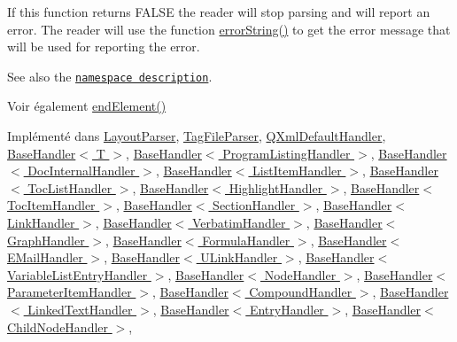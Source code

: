 If this function returns F\+A\+L\+S\+E the reader will stop parsing and will report an error. The reader will use the function \hyperlink{class_q_xml_content_handler_adba96547bad1cf1b009dbfb7b7c571be}{error\+String()} to get the error message that will be used for reporting the error.

See also the \href{xml-sax.html#namespaces}{\tt namespace description}.

\begin{DoxySeeAlso}{Voir également}
\hyperlink{class_q_xml_content_handler_af0abc06326798a6e522f91e6174b7b9e}{end\+Element()} 
\end{DoxySeeAlso}


Implémenté dans \hyperlink{class_layout_parser_aa870786ef488ce9d300214dab2c497ae}{Layout\+Parser}, \hyperlink{class_tag_file_parser_ad9f6b4e83d37df58b95a2018d4e2e606}{Tag\+File\+Parser}, \hyperlink{class_q_xml_default_handler_a0381a337b32a16d2ef2a8df9a29cb215}{Q\+Xml\+Default\+Handler}, \hyperlink{class_base_handler_a15c20baf7065b3eb92ae7a336ccdf20b}{Base\+Handler$<$ T $>$}, \hyperlink{class_base_handler_a15c20baf7065b3eb92ae7a336ccdf20b}{Base\+Handler$<$ Program\+Listing\+Handler $>$}, \hyperlink{class_base_handler_a15c20baf7065b3eb92ae7a336ccdf20b}{Base\+Handler$<$ Doc\+Internal\+Handler $>$}, \hyperlink{class_base_handler_a15c20baf7065b3eb92ae7a336ccdf20b}{Base\+Handler$<$ List\+Item\+Handler $>$}, \hyperlink{class_base_handler_a15c20baf7065b3eb92ae7a336ccdf20b}{Base\+Handler$<$ Toc\+List\+Handler $>$}, \hyperlink{class_base_handler_a15c20baf7065b3eb92ae7a336ccdf20b}{Base\+Handler$<$ Highlight\+Handler $>$}, \hyperlink{class_base_handler_a15c20baf7065b3eb92ae7a336ccdf20b}{Base\+Handler$<$ Toc\+Item\+Handler $>$}, \hyperlink{class_base_handler_a15c20baf7065b3eb92ae7a336ccdf20b}{Base\+Handler$<$ Section\+Handler $>$}, \hyperlink{class_base_handler_a15c20baf7065b3eb92ae7a336ccdf20b}{Base\+Handler$<$ Link\+Handler $>$}, \hyperlink{class_base_handler_a15c20baf7065b3eb92ae7a336ccdf20b}{Base\+Handler$<$ Verbatim\+Handler $>$}, \hyperlink{class_base_handler_a15c20baf7065b3eb92ae7a336ccdf20b}{Base\+Handler$<$ Graph\+Handler $>$}, \hyperlink{class_base_handler_a15c20baf7065b3eb92ae7a336ccdf20b}{Base\+Handler$<$ Formula\+Handler $>$}, \hyperlink{class_base_handler_a15c20baf7065b3eb92ae7a336ccdf20b}{Base\+Handler$<$ E\+Mail\+Handler $>$}, \hyperlink{class_base_handler_a15c20baf7065b3eb92ae7a336ccdf20b}{Base\+Handler$<$ U\+Link\+Handler $>$}, \hyperlink{class_base_handler_a15c20baf7065b3eb92ae7a336ccdf20b}{Base\+Handler$<$ Variable\+List\+Entry\+Handler $>$}, \hyperlink{class_base_handler_a15c20baf7065b3eb92ae7a336ccdf20b}{Base\+Handler$<$ Node\+Handler $>$}, \hyperlink{class_base_handler_a15c20baf7065b3eb92ae7a336ccdf20b}{Base\+Handler$<$ Parameter\+Item\+Handler $>$}, \hyperlink{class_base_handler_a15c20baf7065b3eb92ae7a336ccdf20b}{Base\+Handler$<$ Compound\+Handler $>$}, \hyperlink{class_base_handler_a15c20baf7065b3eb92ae7a336ccdf20b}{Base\+Handler$<$ Linked\+Text\+Handler $>$}, \hyperlink{class_base_handler_a15c20baf7065b3eb92ae7a336ccdf20b}{Base\+Handler$<$ Entry\+Handler $>$}, \hyperlink{class_base_handler_a15c20baf7065b3eb92ae7a336ccdf20b}{Base\+Handler$<$ Child\+Node\+Handler $>$}, 